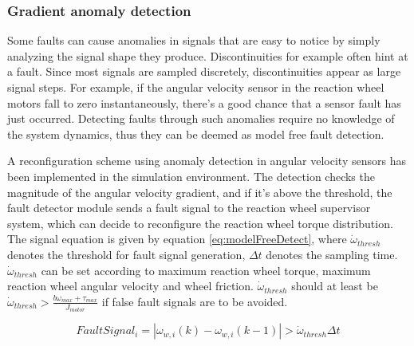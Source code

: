 \subsubsection{Gradient anomaly detection }
\label{sec:ModelFreeFD}

Some faults can cause anomalies in signals that are easy to notice by simply analyzing the signal shape they produce. Discontinuities for example often hint at a fault. Since most signals are sampled discretely, discontinuities appear as large signal steps. For example, if the angular velocity sensor in the reaction wheel motors fall to zero instantaneously, there's a good chance that a sensor fault has just occurred. Detecting faults through such anomalies require no knowledge of the system dynamics, thus they can be deemed as model free fault detection.

A reconfiguration scheme using anomaly detection in angular velocity sensors has been implemented in the simulation environment. The detection checks the magnitude of the angular velocity gradient, and if it's above the threshold, the fault detector module sends a fault signal to the reaction wheel supervisor system, which can decide to reconfigure the reaction wheel torque distribution. The signal equation is given by equation \ref{eq:modelFreeDetect}, where $\dot{\omega}_{thresh}$ denotes the threshold for fault signal generation, $\Delta t$ denotes the sampling time.  $\dot{\omega}_{thresh}$ can be set according to maximum reaction wheel torque, maximum reaction wheel angular velocity and wheel friction. $\dot{\omega}_{thresh}$ should at  least be $\dot{\omega}_{thresh} > \frac{b \omega_{max} + \tau_{max}}{J_{motor}}$ if false fault signals are to be avoided.

\begin{equation}
\label{eq:modelFreeDetect}
FaultSignal_i = |\omega_{w,i}(k) - \omega_{w,i}(k-1)| > \dot{\omega}_{thresh} \Delta t
\end{equation}





